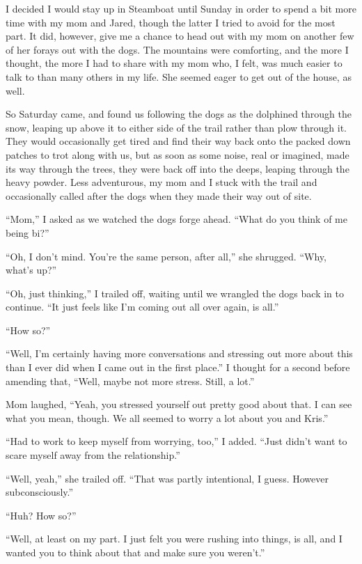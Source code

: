 I decided I would stay up in Steamboat until Sunday in order to spend a bit more time with my mom and Jared, though the latter I tried to avoid for the most part.  It did, however, give me a chance to head out with my mom on another few of her forays out with the dogs.  The mountains were comforting, and the more I thought, the more I had to share with my mom who, I felt, was much easier to talk to than many others in my life.  She seemed eager to get out of the house, as well.

So Saturday came, and found us following the dogs as the dolphined through the snow, leaping up above it to either side of the trail rather than plow through it.  They would occasionally get tired and find their way back onto the packed down patches to trot along with us, but as soon as some noise, real or imagined, made its way through the trees, they were back off into the deeps, leaping through the heavy powder.  Less adventurous, my mom and I stuck with the trail and occasionally called after the dogs when they made their way out of site.

``Mom,'' I asked as we watched the dogs forge ahead.  ``What do you think of me being bi?''

``Oh, I don't mind.  You're the same person, after all,'' she shrugged.  ``Why, what's up?''

``Oh, just thinking,'' I trailed off, waiting until we wrangled the dogs back in to continue.  ``It just feels like I'm coming out all over again, is all.''

``How so?''

``Well, I'm certainly having more conversations and stressing out more about this than I ever did when I came out in the first place.''  I thought for a second before amending that, ``Well, maybe not more stress.  Still, a lot.''

Mom laughed, ``Yeah, you stressed yourself out pretty good about that.  I can see what you mean, though.  We all seemed to worry a lot about you and Kris.''

``Had to work to keep myself from worrying, too,'' I added.  ``Just didn't want to scare myself away from the relationship.''

``Well, yeah,'' she trailed off.  ``That was partly intentional, I guess.  However subconsciously.''

``Huh?  How so?''

``Well, at least on my part.  I just felt you were rushing into things, is all, and I wanted you to think about that and make sure you weren't.''


